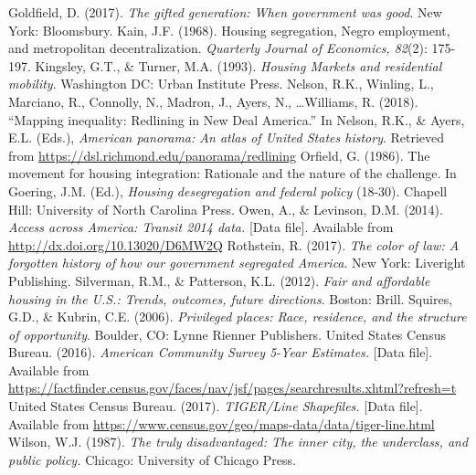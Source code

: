 \documentclass[paper=letter, fontsize=12pt]{scrartcl} %
\begin{document}
\begin{thebibliography}{9}
		Goldfield, D. (2017). \textit{The gifted generation: When government was good}. New York: Bloomsbury.
		Kain, J.F. (1968). Housing segregation, Negro employment, and metropolitan decentralization. \textit{Quarterly Journal of Economics, 82}(2): 175-197.
		Kingsley, G.T., \& Turner, M.A. (1993). \textit{Housing Markets and residential mobility}. Washington DC: Urban Institute Press.
		Nelson, R.K., Winling, L., Marciano, R., Connolly, N., Madron, J., Ayers, N., \ldots Williams, R. (2018). ``Mapping inequality: Redlining in New Deal America.'' In Nelson, R.K., \& Ayers, E.L. (Eds.), \textit{American panorama: An atlas of United States history}. Retrieved from \href{https://dsl.richmond.edu/panorama/redlining}{https://dsl.richmond.edu/panorama/redlining}
		Orfield, G. (1986). The movement for housing integration: Rationale and the nature of the challenge. In Goering, J.M. (Ed.), \textit{Housing desegregation and federal policy} (18-30). Chapell Hill: University of North Carolina Press.
		Owen, A., \& Levinson, D.M. (2014). \textit{Access across America: Transit 2014 data.} [Data file]. Available from \href{http://dx.doi.org/10.13020/D6MW2Q}{http://dx.doi.org/10.13020/D6MW2Q}
		Rothstein, R. (2017). \textit{The color of law: A forgotten history of how our government segregated America}. New York: Liveright Publishing.
		Silverman, R.M., \& Patterson, K.L. (2012). \textit{Fair and affordable housing in the U.S.: Trends, outcomes, future directions}. Boston: Brill.
		Squires, G.D., \& Kubrin, C.E. (2006). \textit{Privileged places: Race, residence, and the structure of opportunity}. Boulder, CO: Lynne Rienner Publishers.
		United States Census Bureau. (2016). \textit{American Community Survey 5-Year Estimates.} [Data file]. Available from \href{https://factfinder.census.gov/faces/nav/jsf/pages/searchresults.xhtml?refresh=t}{https://factfinder.census.gov/faces/nav/jsf/pages/searchresults.xhtml?refresh=t}
		United States Census Bureau. (2017). \textit{TIGER/Line Shapefiles.} [Data file]. Available from \href{https://www.census.gov/geo/maps-data/data/tiger-line.html}{https://www.census.gov/geo/maps-data/data/tiger-line.html}
		Wilson, W.J. (1987). \textit{The truly disadvantaged: The inner city, the underclass, and public policy.} Chicago: University of Chicago Press.
	\end{thebibliography}
	
	
\end{document}
